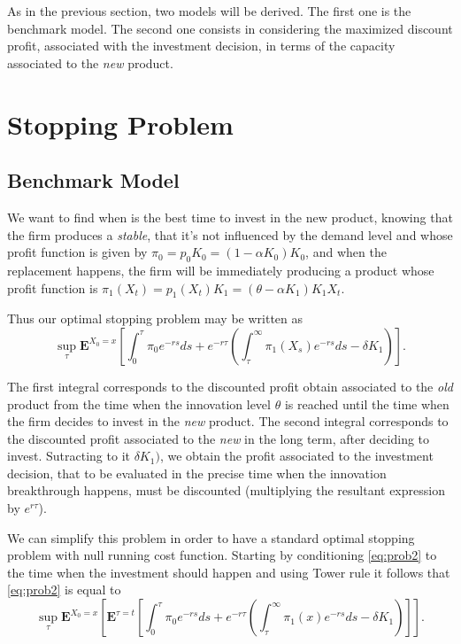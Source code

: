 As in the previous section, two models will be derived. The first one is the benchmark model. The second one consists in considering the maximized discount profit, associated with the investment decision, in terms of the capacity associated to the \textit{new} product.



\section{Stopping Problem}
\label{section:2_theory}



\subsection{Benchmark Model}
\label{subsec:2_bm}

We want to find when is the best time to invest in the new product, knowing that the firm produces a \textit{stable}, that it's not influenced by the demand level and whose profit function is given by $\pi_0=p_0 K_0=(1-\alpha K_0)K_0$, and when the replacement happens, the firm will be immediately producing a product whose profit function is $\pi_1(X_t)=p_1(X_t) K_1 =(\theta-\alpha K_1)K_1 X_t$.

Thus our optimal stopping problem may be written as
\begin{equation}
\sup _\tau \textbf{E}^{X_0=x} \left[ \int_0^\tau \pi_0e^{-rs} ds + e^{-r\tau} \left( \int_\tau^\infty \pi_1(X_s)e^{-rs}ds -\delta K_1 \right) \right].
\label{eq:prob2}
\end{equation}

The first integral corresponds to the discounted profit obtain associated to the \textit{old} product from the time when the innovation level $\theta$ is reached until the time when the firm decides to invest in the \textit{new} product. The second integral corresponds to the discounted profit associated to the \textit{new} in the long term, after deciding to invest. Sutracting to it $\delta K_1)$, we obtain the profit associated to the investment decision, that to be evaluated in the precise time when the innovation breakthrough happens, must be discounted (multiplying the resultant expression by $e^{r \tau}$).

We can simplify this problem in order to have a standard optimal stopping problem with null running cost function.
Starting by conditioning \eqref{eq:prob2} to the time when the investment should happen and using Tower rule it follows that \eqref{eq:prob2} is equal to
\begin{equation}
\sup _\tau \textbf{E}^{X_0=x} \left[ \textbf{E}^{\tau=t} \left[  \int_0^\tau \pi_0e^{-rs} ds + e^{-r\tau} \left( \int_\tau^\infty \pi_1(x)e^{-rs}ds -\delta K_1 \right) \right] \right].
\label{eq:prob21}
\end{equation}

